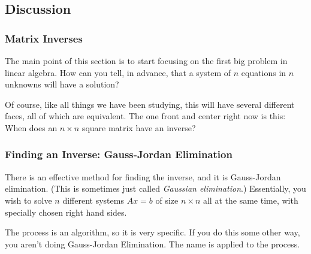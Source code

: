 \documentclass[10pt,]{book}
\theoremstyle{plain}
\numberwithin{equation}{section}
\begin{document}
\subsection[Discussion]{Discussion}\label{subsection-43}
\typeout{************************************************}
\typeout{************************************************}
\subsubsection[Matrix Inverses]{Matrix Inverses}\label{subsubsection-20}

        The main point of this section is to start focusing on the first big
        problem in linear algebra. How can you tell, in advance, that a system
        of \(n\) equations in \(n\) unknowns will have a solution?
\par

        Of course, like all things we have been studying, this will have several
        different faces, all of which are equivalent. The one front and center
        right now is this: When does an \(n \times n\) square matrix have an inverse?
\typeout{************************************************}
\typeout{************************************************}
\subsubsection[Finding an Inverse: Gauss-Jordan Elimination]{Finding an Inverse: Gauss-Jordan Elimination}\label{subsubsection-21}

        There is an effective method for finding the inverse, and it is
        Gauss-Jordan elimination. (This is sometimes just called
        \emph{Gaussian elimination}.) Essentially, you wish to solve \(n\)
        different systems \(Ax= b\) of size \(n\times n\) all at the same
        time, with specially chosen right hand sides.
\par

        The process is an algorithm, so it is very specific. If you do this some
        other way, you aren't doing Gauss-Jordan Elimination. The name is applied
        to the process.
\par
\end{document}
